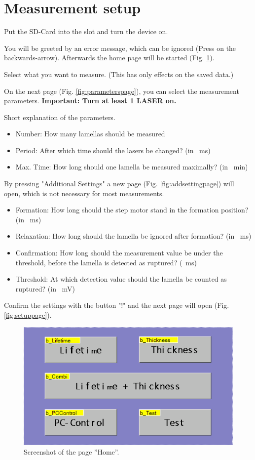 	\section{Measurement setup}
	Put the SD-Card into the slot and turn the device on. 

	You will be greeted by an error message, which can be ignored (Press on the backwards-arrow).
	Afterwards the home page will be started (Fig. \ref{fig:homepage}).
	
	Select what you want to measure. (This has only effects on the saved data.)
	
	On the next page (Fig. \ref{fig:parameterspage}), you can select the measurement parameters. 
	\textbf{Important: Turn at least 1 LASER on. }
	
	Short explanation of the parameters. 
	\begin{itemize}
		\item Number: How many lamellas should be measured
		\item Period: After which time should the lasers be changed? (in \SI{}{\milli\second})
		\item Max. Time: How long should one lamella be measured maximally? (in \SI{}{\minute})
	\end{itemize}
	
	By pressing "Additional Settings" a new page (Fig. \ref{fig:addsettingpage}) will open, which is not necessary for most measurements. 
	
	\begin{itemize}
		\item Formation: How long should the step motor stand in the formation position? (in \SI{}{\milli\second})
		\item Relaxation: How long should the lamella be ignored after formation? (in \SI{}{\milli\second})
		\item Confirmation: How long should the measurement value be under the threshold, before the lamella is detected as ruptured? (\SI{}{\milli\second})
		\item Threshold: At which detection value should the lamella be counted as ruptured? (in \SI{}{\milli\volt})
	\end{itemize}
	
	Confirm the settings with the button "!" and the next page will open (Fig. \ref{fig:setuppage}).
	
	\begin{figure}
		\centering
		\includegraphics[width=0.7\linewidth]{LamellaDevice_Hardware/HomePage}
		\caption{Screenshot of the page ''Home''.}
		\label{fig:homepage}
	\end{figure}

